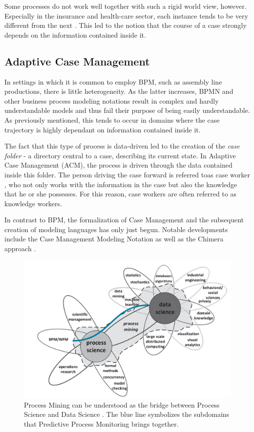 Some processes do not work well together with such a rigid world view, however. Especially in the insurance and health-care sector, each instance tends to be very different from the next \cite{hewelt2016}. This led to the notion that the course of a case strongly depends on the information contained inside it.

\subsection{Adaptive Case Management}
In settings in which it is common to employ BPM, such as assembly line productions, there is little heterogeneity. As the latter increases, BPMN and other business process modeling notations result in complex and hardly understandable models and thus fail their purpose of being easily understandable. As previously mentioned, this tends to occur in domains where the case trajectory is highly dependant on information contained inside it.

The fact that this type of process is data-driven led to the creation of the \textit{case folder} - a directory central to a case, describing its current state. In Adaptive Case Management (ACM), the process is driven through the data contained inside this folder. The person driving the case forward is referred toas case worker \cite{drucker1999}, who not only works with the information in the case but also the knowledge that he or she possesses. For this reason, case workers are often referred to as knowledge workers.

In contrast to BPM, the formalization of Case Management and the subsequent creation of modeling languages has only just begun. Notable developments include the Case Management Modeling Notation \cite{web:cmmn} as well as the Chimera approach \cite{hewelt2016}.

\begin{figure}[ht!]
    \centering
    \includegraphics[width=.8\textwidth]{gfx/process-data-science.png}
    \caption{Process Mining can be understood as the bridge between Process Science and Data Science \cite[p.18]{Aalst2016}. The blue line symbolizes the subdomains that Predictive Process Monitoring brings together.}
    \label{fig:process-data-science}
\end{figure}

